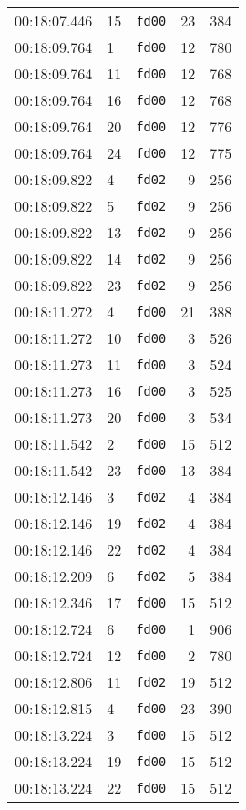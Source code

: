 \documentclass{article}
\begin{document}
\begin{longtable}{lllrr}
00:18:07.446 & 15 & \texttt{fd00} & 23 & 384 \\
00:18:09.764 & 1 & \texttt{fd00} & 12 & 780 \\
00:18:09.764 & 11 & \texttt{fd00} & 12 & 768 \\
00:18:09.764 & 16 & \texttt{fd00} & 12 & 768 \\
00:18:09.764 & 20 & \texttt{fd00} & 12 & 776 \\
00:18:09.764 & 24 & \texttt{fd00} & 12 & 775 \\
00:18:09.822 & 4 & \texttt{fd02} & 9 & 256 \\
00:18:09.822 & 5 & \texttt{fd02} & 9 & 256 \\
00:18:09.822 & 13 & \texttt{fd02} & 9 & 256 \\
00:18:09.822 & 14 & \texttt{fd02} & 9 & 256 \\
00:18:09.822 & 23 & \texttt{fd02} & 9 & 256 \\
00:18:11.272 & 4 & \texttt{fd00} & 21 & 388 \\
00:18:11.272 & 10 & \texttt{fd00} & 3 & 526 \\
00:18:11.273 & 11 & \texttt{fd00} & 3 & 524 \\
00:18:11.273 & 16 & \texttt{fd00} & 3 & 525 \\
00:18:11.273 & 20 & \texttt{fd00} & 3 & 534 \\
00:18:11.542 & 2 & \texttt{fd00} & 15 & 512 \\
00:18:11.542 & 23 & \texttt{fd00} & 13 & 384 \\
00:18:12.146 & 3 & \texttt{fd02} & 4 & 384 \\
00:18:12.146 & 19 & \texttt{fd02} & 4 & 384 \\
00:18:12.146 & 22 & \texttt{fd02} & 4 & 384 \\
00:18:12.209 & 6 & \texttt{fd02} & 5 & 384 \\
00:18:12.346 & 17 & \texttt{fd00} & 15 & 512 \\
00:18:12.724 & 6 & \texttt{fd00} & 1 & 906 \\
00:18:12.724 & 12 & \texttt{fd00} & 2 & 780 \\
00:18:12.806 & 11 & \texttt{fd02} & 19 & 512 \\
00:18:12.815 & 4 & \texttt{fd00} & 23 & 390 \\
00:18:13.224 & 3 & \texttt{fd00} & 15 & 512 \\
00:18:13.224 & 19 & \texttt{fd00} & 15 & 512 \\
00:18:13.224 & 22 & \texttt{fd00} & 15 & 512 \\

\end{longtable}
\end{document}
